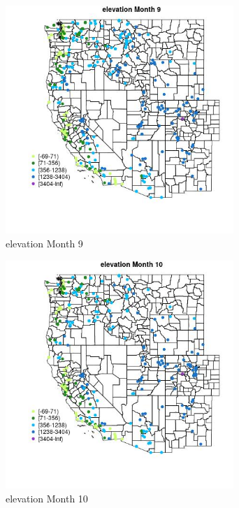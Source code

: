 \begin{figure} 
\centering  
\includegraphics[width=0.77\textwidth]{Code_Outputs/Report_ML_input_PM25_Step4_part_e_de_duplicated_aveswNAs_MapObsMo9elevation.jpg} 
\caption{\label{fig:Report_ML_input_PM25_Step4_part_e_de_duplicated_aveswNAsMapObsMo9elevation}elevation Month 9} 
\end{figure} 
 

\begin{figure} 
\centering  
\includegraphics[width=0.77\textwidth]{Code_Outputs/Report_ML_input_PM25_Step4_part_e_de_duplicated_aveswNAs_MapObsMo10elevation.jpg} 
\caption{\label{fig:Report_ML_input_PM25_Step4_part_e_de_duplicated_aveswNAsMapObsMo10elevation}elevation Month 10} 
\end{figure} 
 

